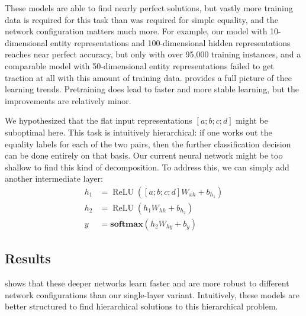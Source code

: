 \documentclass[9pt,twocolumn,twoside,lineno]{pnas-new}
\newcommand{\update}[1]{{\color{darkblue}#1}}
\newcommand{\softmax}{\mathbf{softmax}}
\DeclareMathOperator{\ReLU}{ReLU}
\begin{document}
These models are able to find nearly perfect solutions, but vastly more training data is required for this task than was required for simple equality, and the network configuration matters much more. For example, our model with 10-dimensional entity representations and 100-dimensional hidden representations reaches near perfect accuracy, but only with over 95,000 training instances, and a comparable model with 50-dimensional entity representations failed to get traction at all with this amount of training data. \update{ provides a full picture of thee learning trends. Pretraining does lead to faster and more stable learning, but the improvements are relatively minor.}

We hypothesized that the flat input representations $[a;b;c;d]$ might be suboptimal here. This task is intuitively hierarchical: if one works out the equality labels for each of the two pairs, then the further classification decision can be done entirely on that basis. Our current neural network might be too shallow to find this kind of decomposition.  To address this, we can simply add another intermediate layer:
%
\begin{align}
  h_{1} &= \ReLU([a;b;c;d]W_{xh} + b_{h_{1}}) \label{eq:x2h1}\\
  h_{2} &= \ReLU(h_{1}W_{hh} + b_{h_{2}}) \label{eq:x2h2}\\
  y &= \softmax(h_{2}W_{hy} + b_{y}) \label{eq:h2y2}
\end{align}


\subsection{Results}

\update{ shows that} these deeper networks learn faster and are more robust to different network configurations than our single-layer variant. Intuitively, these models are better structured to find hierarchical solutions to this hierarchical problem.
\end{document}
